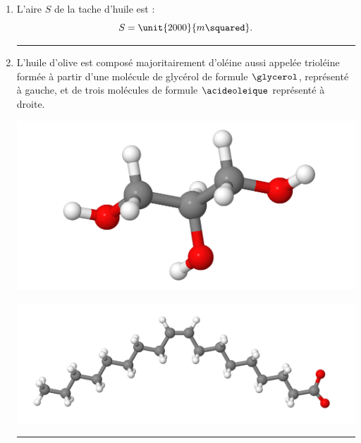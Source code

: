 \documentclass[12pt,a4paper]{article}
\begin{document}
\begin{enumerate}
\hrule{}
\vspace{5pt}
\item
L'aire $S$ de la tache d'huile est :
\[
S = \unit{2000}{m\squared}.
\]

\hrule{}
\vspace{5pt}
\item L'huile d'olive est composé majoritairement d'oléine aussi appelée trioléine formée à partir d'une molécule de glycérol de formule $\glycerol$, représenté à gauche, et de trois molécules de formule $\acideoleique$ représenté à droite.
\begin{multicols}{2}
\center
\includegraphics[scale=0.2]{images/glycerol.png}

\includegraphics[scale=0.2]{images/acide_oleique.png}
\end{multicols}

\hrule{}
\end{enumerate}
\end{document}
